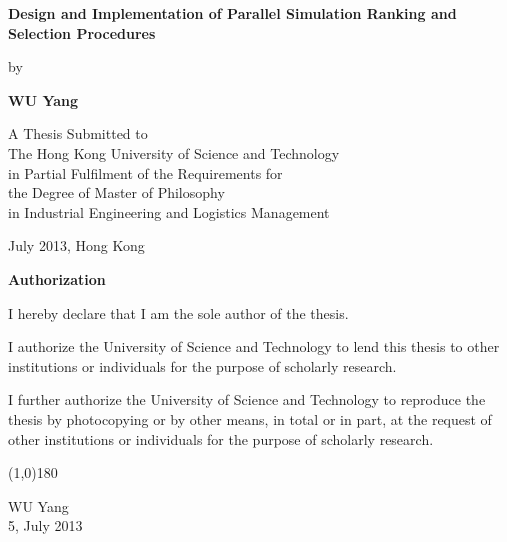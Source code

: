 \documentclass[12pt,a4paper]{report}
\begin{document}

\null\vspace{0.5in}
\begin{center}
{\Large\bf Design and Implementation of Parallel Simulation Ranking and Selection Procedures}
\vspace{2.5cm}

{\large by}
\vspace{0.5cm}

{\large\bf WU Yang}\normalsize
\vspace{1cm}

A Thesis Submitted to \\
The Hong Kong University of Science and Technology \\
in Partial Fulfilment of the Requirements for \\
the Degree of Master of Philosophy \\
in Industrial Engineering and Logistics Management
\vspace{1.5cm}

July 2013, Hong Kong
\end{center}
\thispagestyle{empty}
\newpage

\begin{center}{\Large\bf Authorization}\normalsize
\end{center}
\vspace{0.5cm}

I hereby declare that I am the sole author of the thesis.

\vspace{0.5cm}

I authorize the University of Science and Technology to lend this thesis
to other institutions or individuals for the purpose of scholarly research.

\vspace{0.5cm}

I further authorize the University of Science and Technology to
reproduce the thesis by photocopying or by other means, in total or in
part, at the request of other institutions or individuals for the
purpose of scholarly research.

\vspace{1.5cm}

\begin{center}
\line(1,0){180}
\smallskip

WU Yang \\
5, July 2013
\end{center}
\end{document}
